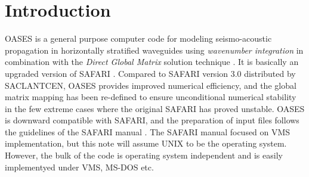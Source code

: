 \section{Introduction}

OASES is a general purpose computer code for modeling seismo-acoustic
propagation in horizontally stratified waveguides using {\em
wavenumber integration} in combination with the {\em Direct Global Matrix
} solution technique \cite{sj:jasa85,st:gjras86,jkps}. It is
basically 
an upgraded
version 
of SAFARI \cite{hs:saf}. Compared to SAFARI
version 3.0 distributed by SACLANTCEN, OASES provides improved
numerical efficiency, and the global matrix mapping has been
re-defined to ensure unconditional numerical stability in the few
extreme cases where the original SAFARI has proved unstable.
OASES is downward compatible with SAFARI, and the preparation
of input files follows the guidelines of the SAFARI manual
\cite{hs:saf}. The SAFARI manual focused on VMS implementation, but
this note will assume UNIX to be the operating system. However, the
bulk of the code is operating system independent and is easily
implementyed under VMS, MS-DOS etc. 





























